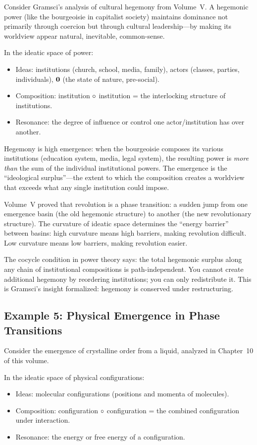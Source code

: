 Consider Gramsci's analysis of cultural hegemony from Volume~V. A hegemonic
power (like the bourgeoisie in capitalist society) maintains dominance not
primarily through coercion but through cultural leadership---by making its
worldview appear natural, inevitable, common-sense.

In the ideatic space of power:
\begin{itemize}
  \item Ideas: institutions (church, school, media, family), actors (classes,
    parties, individuals), $\mathbf{0}$ (the state of nature, pre-social).
  \item Composition: institution $\circ$ institution = the interlocking
    structure of institutions.
  \item Resonance: the degree of influence or control one actor/institution
    has over another.
\end{itemize}

Hegemony is high emergence: when the bourgeoisie composes its various
institutions (education system, media, legal system), the resulting power is
\emph{more than} the sum of the individual institutional powers. The emergence
is the ``ideological surplus''---the extent to which the composition creates
a worldview that exceeds what any single institution could impose.

Volume~V proved that revolution is a phase transition: a sudden jump from one
emergence basin (the old hegemonic structure) to another (the new revolutionary
structure). The curvature of ideatic space determines the ``energy barrier''
between basins: high curvature means high barriers, making revolution difficult.
Low curvature means low barriers, making revolution easier.

The cocycle condition in power theory says: the total hegemonic surplus along
any chain of institutional compositions is path-independent. You cannot create
additional hegemony by reordering institutions; you can only redistribute it.
This is Gramsci's insight formalized: hegemony is conserved under restructuring.

\subsection{Example 5: Physical Emergence in Phase Transitions}

Consider the emergence of crystalline order from a liquid, analyzed in
Chapter~10 of this volume.

In the ideatic space of physical configurations:
\begin{itemize}
  \item Ideas: molecular configurations (positions and momenta of molecules).
  \item Composition: configuration $\circ$ configuration = the combined
    configuration under interaction.
  \item Resonance: the energy or free energy of a configuration.
\end{itemize}

